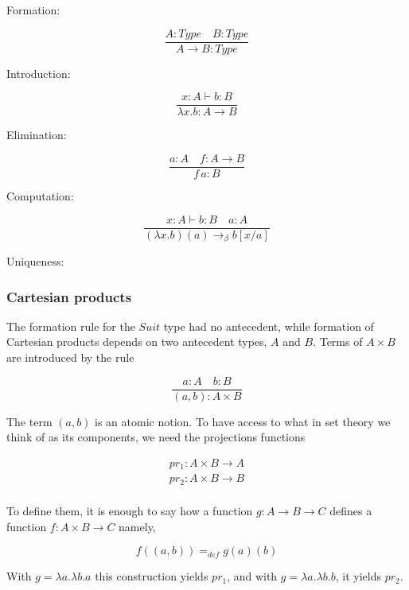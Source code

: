 Formation:

\begin{equation}
\frac{A : Type \quad B : Type }{A \to B : Type}
\end{equation}


Introduction:

\begin{equation}
\frac{x :  A \vdash b : B}{ \lambda x. b : A \to B}
\end{equation}

Elimination:

\begin{equation}
\frac{a : A \quad f : A \to B }{ f \,a : B}
\end{equation}

Computation:

\begin{equation}
\frac{x :  A \vdash b : B \quad a: A }{(\lambda x. b)(a) \to_\beta b[x/a]}
\end{equation}


Uniqueness:


\subsubsection{Cartesian products}

The formation rule for the $Suit$ type had no antecedent, while formation of  Cartesian products depends on two antecedent types, $A$  and $B$. Terms of $A\times B$ are introduced by the rule

\begin{equation}
\frac{a : A \quad b : B}{(a,b) : A \times B}
\end{equation}

The term $(a,b)$ is an atomic notion. To have access to what in set theory we think of as its components, we need the projections functions

\begin{align}
pr_1 : A \times B \to A \\
pr_2 : A \times B \to B \\
\end{align}

To define them, it is enough to say how a function $g : A \to B \to C$ defines a function $f: A\times B \to C$ namely,

\begin{equation}
f((a,b)) =_{def} g(a)(b)
\end{equation}


With $g =\lambda a.\lambda b . a$ this construction yields $pr_1$, and with
$g =\lambda a.\lambda b . b$, it yields $pr_2$.





